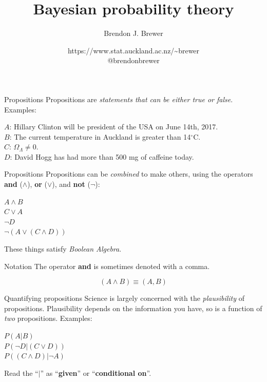\documentclass{beamer}
\author{Brendon J. Brewer}
\title{Bayesian probability theory}
\institute{Department of Statistics, The University of Auckland}
\date{{\color{blue} https://www.stat.auckland.ac.nz/\~{ }brewer}\\
\vspace{10pt}
{\color{blue} @brendonbrewer}}
\begin{document}
\begin{frame}[t,plain]
\titlepage
\end{frame}

\begin{frame}[t]{Propositions}
Propositions are {\it statements that can be either true or false}.\\
Examples:\vspace{20pt}

$A$: {\small Hillary Clinton will be president of the USA on June 14th, 2017.}\\
$B$: {\small The current temperature in Auckland is greater than 14$^{\circ}$C.}\\
$C$: {\small $\Omega_\Lambda \neq 0$.}\\
$D$: {\small David Hogg has had more than 500 mg of caffeine today.}
\end{frame}

\begin{frame}[t]{Propositions}
Propositions can be {\it combined} to make others, using the operators
{\bf and} ($\wedge$), {\bf or} ($\vee$), and {\bf not} ($\neg$): \vspace{20pt}

$A \wedge B$\\
$C \vee A$\\
$\neg D$\\
$\neg (A \vee (C \wedge D))$\vspace{20pt}

These things satisfy {\it Boolean Algebra}.
\end{frame}

\begin{frame}[t]{Notation}
The operator {\bf and} is sometimes denoted with a comma.\vspace{20pt}

\begin{equation}
(A \wedge B) \equiv (A, B)
\end{equation}

\end{frame}

\begin{frame}[t]{Quantifying propositions}
Science is largely concerned with the {\it plausibility} of propositions.
Plausibility depends on the information you have, so is a function of {\it
two} propositions. Examples:\vspace{20pt}

$P(A | B)$\\
$P(\neg D | (C \vee D))$\\
$P((C \wedge D) | \neg A)$\vspace{20pt}

Read the ``$|$'' as ``{\bf given}'' or ``{\bf conditional on}''.
\end{frame}
\end{document}
